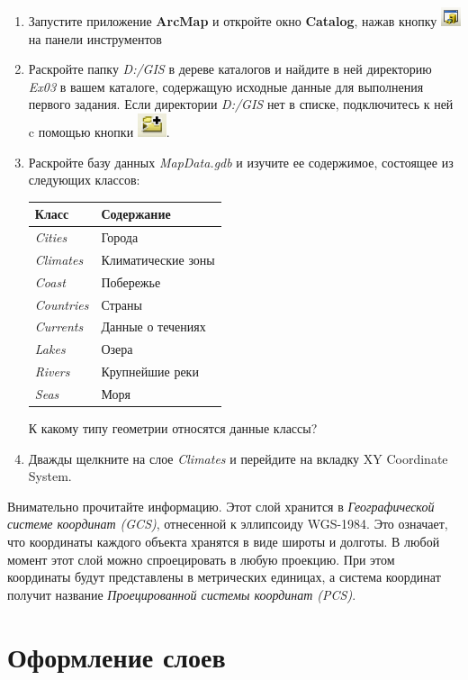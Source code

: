 \documentclass[]{book}
\theoremstyle{definition}
\theoremstyle{definition}
\theoremstyle{definition}
\theoremstyle{remark}
\begin{document}
\begin{enumerate}
\def\labelenumi{\arabic{enumi}.}
\item
  Запустите приложение \textbf{ArcMap} и откройте окно \textbf{Catalog},
  нажав кнопку \includegraphics{images/Ex03/image5.png} на панели
  инструментов
\item
  Раскройте папку \emph{D:/GIS} в дереве каталогов и найдите в ней
  директорию \emph{Ex03} в вашем каталоге, содержащую исходные данные
  для выполнения первого задания. Если директории \emph{D:/GIS} нет в
  списке, подключитесь к ней c помощью кнопки
  \includegraphics{images/Ex03/image6.png}.
\item
  Раскройте базу данных \emph{MapData.gdb} и изучите ее содержимое,
  состоящее из следующих классов:

  \begin{longtable}[]{@{}ll@{}}
  \toprule
  \textbf{Класс} & \textbf{Содержание}\tabularnewline
  \midrule
  \endhead
  \emph{Cities} & Города\tabularnewline
  \emph{Climates} & Климатические зоны\tabularnewline
  \emph{Coast} & Побережье\tabularnewline
  \emph{Countries} & Страны\tabularnewline
  \emph{Currents} & Данные о течениях\tabularnewline
  \emph{Lakes} & Озера\tabularnewline
  \emph{Rivers} & Крупнейшие реки\tabularnewline
  \emph{Seas} & Моря\tabularnewline
  \bottomrule
  \end{longtable}

  К какому типу геометрии относятся данные классы?
\item
  Дважды щелкните на слое \emph{Climates} и перейдите на вкладку XY
  Coordinate System.
\end{enumerate}

Внимательно прочитайте информацию. Этот слой хранится в
\emph{Географической системе координат (GCS)}, отнесенной к эллипсоиду
WGS-1984. Это означает, что координаты каждого объекта хранятся в виде
широты и долготы. В любой момент этот слой можно спроецировать в любую
проекцию. При этом координаты будут представлены в метрических единицах,
а система координат получит название \emph{Проецированной системы
координат (PCS)}.

\hypertarget{map-design-climates-layers}{%
\section{Оформление слоев}\label{map-design-climates-layers}}
\end{document}
